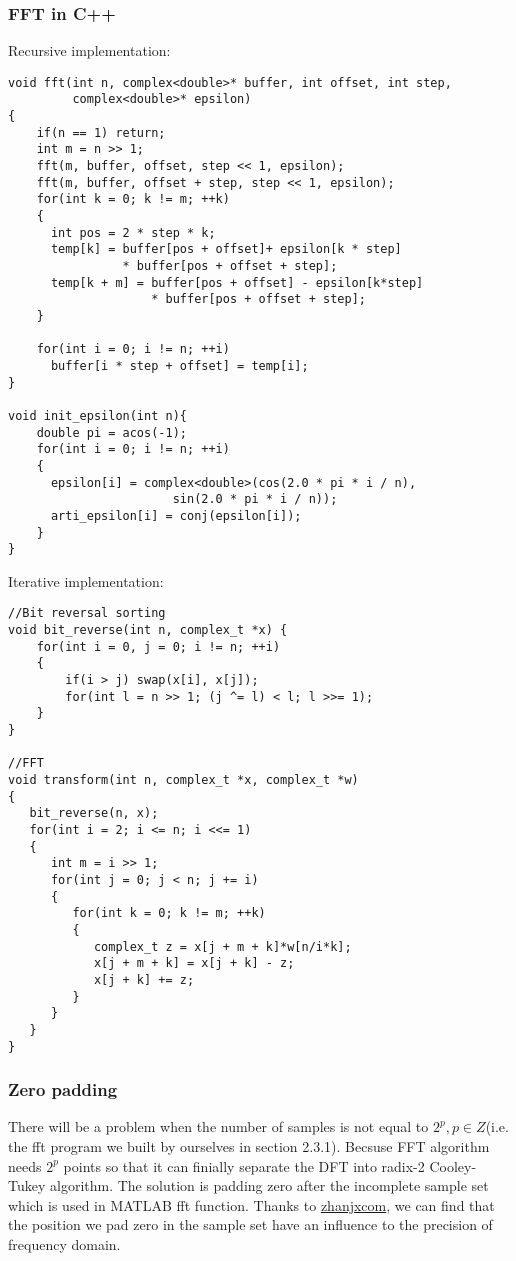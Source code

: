 \documentclass[12pt,a4paper]{article}
\begin{document}
\subsubsection{FFT in C++}
Recursive implementation:
\lstset{language=C++}
\begin{lstlisting}
void fft(int n, complex<double>* buffer, int offset, int step,
         complex<double>* epsilon) 
{
	if(n == 1) return;
	int m = n >> 1;
	fft(m, buffer, offset, step << 1, epsilon);
	fft(m, buffer, offset + step, step << 1, epsilon);
	for(int k = 0; k != m; ++k)
	{
	  int pos = 2 * step * k;
	  temp[k] = buffer[pos + offset]+ epsilon[k * step] 
		        * buffer[pos + offset + step];
	  temp[k + m] = buffer[pos + offset] - epsilon[k*step] 
	                * buffer[pos + offset + step];
	}

	for(int i = 0; i != n; ++i)
	  buffer[i * step + offset] = temp[i];
}

void init_epsilon(int n){
	double pi = acos(-1);
	for(int i = 0; i != n; ++i)
	{
	  epsilon[i] = complex<double>(cos(2.0 * pi * i / n),
		               sin(2.0 * pi * i / n)); 
	  arti_epsilon[i] = conj(epsilon[i]);
	}
}
\end{lstlisting} 

\newpage
Iterative implementation:
\lstset{language=C++}
\begin{lstlisting}
//Bit reversal sorting
void bit_reverse(int n, complex_t *x) {
	for(int i = 0, j = 0; i != n; ++i)
	{
		if(i > j) swap(x[i], x[j]);
		for(int l = n >> 1; (j ^= l) < l; l >>= 1);
	}
}

//FFT
void transform(int n, complex_t *x, complex_t *w) 
{
   bit_reverse(n, x);
   for(int i = 2; i <= n; i <<= 1)
   {
	  int m = i >> 1;
	  for(int j = 0; j < n; j += i)
	  {
		 for(int k = 0; k != m; ++k)
		 {
			complex_t z = x[j + m + k]*w[n/i*k];
			x[j + m + k] = x[j + k] - z;
			x[j + k] += z;
		 }
	  }
   }
}
\end{lstlisting} 

\subsubsection{Zero padding}
There will be a problem when the number of samples is not equal to $2^p, p \in Z$(i.e. the fft program we built by ourselves in section 2.3.1). Becsuse FFT algorithm needs $2^p$ points so that it can finially separate the DFT into radix-2 Cooley-Tukey algorithm. The solution is padding zero after the incomplete sample set which is used in MATLAB fft function. Thanks to \href{http://zhanjxcom.lofter.com/post/1cbc8f0a_35fc02b}{zhanjxcom}, we can find that the position we pad zero in the sample set have an influence to the  precision of frequency domain.
\end{document}
